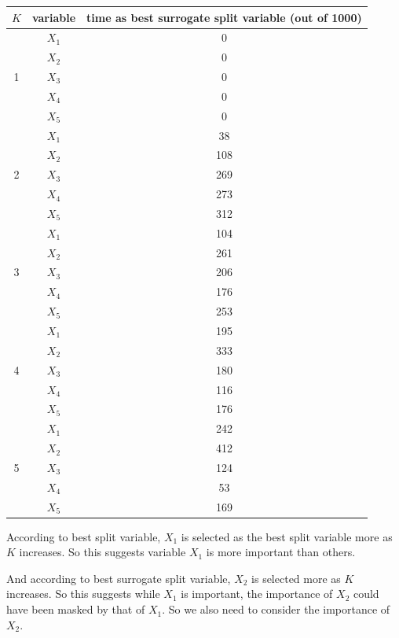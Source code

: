 \documentclass[paper=letter, fontsize=12pt]{article}
\begin{document}
\begin{enumerate}[label=(\alph*)]
\begin{enumerate}[label=(\roman*)]
		\begin{center}
			\begin{longtable}{|c|c|c|}
				\hline
				$K$ & variable & time as best surrogate split variable (out of 1000) \\ \hline
				\multirow{5}{1em}{1} & $X_1$ & 0 \\ 
				& $X_2$ & 0 \\
				& $X_3$ & 0 \\
				& $X_4$ & 0 \\
				& $X_5$ & 0 \\
				\hline
				\multirow{5}{1em}{2} & $X_1$ & 38 \\ 
				& $X_2$ & 108 \\
				& $X_3$ & 269 \\
				& $X_4$ & 273 \\
				& $X_5$ & 312 \\
				\hline
				\multirow{5}{1em}{3} & $X_1$ & 104 \\ 
				& $X_2$ & 261 \\
				& $X_3$ & 206 \\
				& $X_4$ & 176 \\
				& $X_5$ & 253 \\
				\hline
				\multirow{5}{1em}{4} & $X_1$ & 195 \\ 
				& $X_2$ & 333 \\
				& $X_3$ & 180 \\
				& $X_4$ & 116 \\
				& $X_5$ & 176 \\
				\hline
				\multirow{5}{1em}{5} & $X_1$ & 242 \\ 
				& $X_2$ & 412 \\
				& $X_3$ & 124 \\
				& $X_4$ & 53 \\
				& $X_5$ & 169 \\
				\hline
			\end{longtable}
		\end{center}
	
		According to best split variable, $X_1$ is selected as the best split variable more as $K$ increases. So this suggests variable $X_1$ is more important than others.
		
		And according to best surrogate split variable, $X_2$ is selected more as $K$ increases. So this suggests while $X_1$ is important, the importance of $X_2$ could have been masked by that of $X_1$. So we also need to consider the importance of $X_2$.
		

\end{enumerate}
\end{enumerate}
\end{document}
